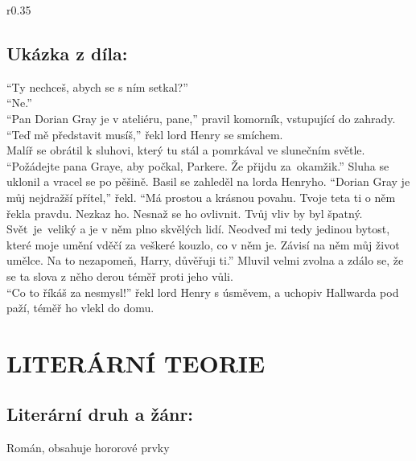 \documentclass{extarticle} %
\begin{document}
\noindent\begin{wrapfigure}{r}{0.35\textwidth}
\tiny

\subsection*{Ukázka z díla:}
\setlength{\parindent}{3pt}
\noindent
\enquote{Ty nechceš, abych se s ním setkal?} \\
\enquote{Ne.} \\
\enquote{Pan Dorian Gray je v ateliéru, pane,} pravil komorník, vstupující do zahrady. \\
\enquote{Teď mě představit musíš,} řekl lord Henry se smíchem. \\
Malíř se obrátil k sluhovi, který tu stál a pomrkával ve slunečním světle.
\enquote{Požádejte pana Graye, aby počkal, Parkere. Že přijdu za~okamžik.}
Sluha se uklonil a vracel se po pěšině.
Basil se zahleděl na lorda Henryho.
\enquote{Dorian Gray je můj nejdražší přítel,} řekl.
\enquote{Má prostou a krásnou povahu.
Tvoje teta ti o něm řekla pravdu.
Nezkaz ho.
Nesnaž se ho ovlivnit.
Tvůj vliv by byl špatný.
Svět~je~veliký a je v něm plno skvělých lidí.
Neodveď mi tedy jedinou bytost, které moje umění vděčí za veškeré kouzlo, co v něm je.
Závisí na něm můj život umělce.
Na to nezapomeň, Harry, důvěřuji ti.}
Mluvil velmi zvolna a zdálo se, že se ta slova z něho derou téměř proti jeho vůli. \\
\enquote{Co to říkáš za nesmysl!} řekl lord Henry s úsměvem, a uchopiv Hallwarda pod paží, téměř ho vlekl do domu. 
\end{wrapfigure}

\section*{LITERÁRNÍ TEORIE}

\subsection*{Literární druh a žánr:}
\noindent
Román, obsahuje hororové prvky


\end{document}
